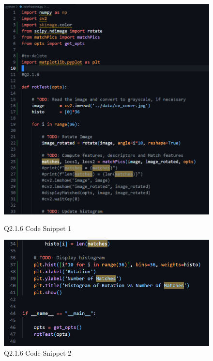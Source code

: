 \documentclass{article}
\begin{document}
	\begin{figure}[H]
	\centering
	\begin{minipage}[b]{0.45\textwidth}
		\centering
		\includegraphics[width=\textwidth]{Q2_1_6_cns1.png}  %
		\caption{Q2.1.6 Code Snippet 1}
		\label{fig:2_14_6_csn1}
	\end{minipage}
	\hfill  %
	\begin{minipage}[b]{0.45\textwidth}
		\centering
		\includegraphics[width=\textwidth]{Q2_1_6_cns2.png}  %
		\caption{Q2.1.6 Code Snippet 2}
		\label{fig:2_14_6_csn2}
	\end{minipage}
	\end{figure}
	
\end{document}
